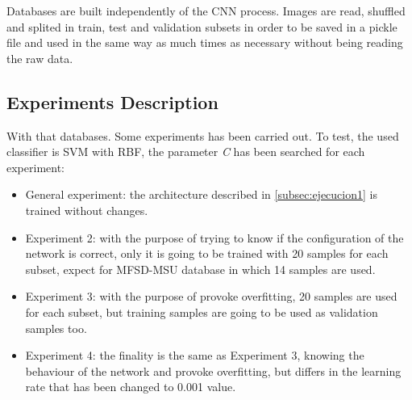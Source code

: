 Databases are built independently of the CNN process. Images are read, shuffled and splited in train, test and validation subsets in order to be saved in a pickle file and used in the same way as much times as necessary without being reading the raw data.\\

\subsection{Experiments Description}
With that databases. Some experiments has been carried out. To test, the used classifier is SVM with RBF, the parameter \textit{C} has been searched for each experiment:

\begin{itemize}
\item General experiment: the architecture described in \ref{subsec:ejecucion1} is trained without changes.
\item Experiment 2: with the purpose of trying to know if the configuration of the network is correct, only it is going to be trained with 20 samples for each subset, expect for MFSD-MSU database in which 14 samples are used.
\item Experiment 3: with the purpose of provoke overfitting, 20 samples are used for each subset, but training samples are going to be used as validation samples too.
\item Experiment 4: the finality is the same as Experiment 3, knowing the behaviour of the network and provoke overfitting, but differs in the learning rate that has been changed to 0.001 value. \\
\end{itemize}



